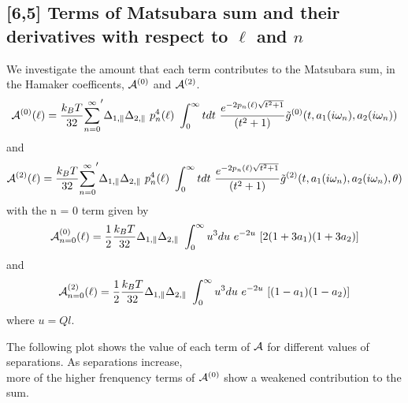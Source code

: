 \documentclass[a4paper]{article}
\begin{document}
\subsection{[6,5] Terms of Matsubara sum and their derivatives with respect to
$\ell$ and $n$}
\begin{center}
We investigate the amount that each term contributes to the Matsubara sum, in\\
the Hamaker coefficents, ${\cal A}^{(0)}$ and ${\cal A}^{(2)}$.
\begin{equation}
{\cal A}^{(0)}(\ell) = \frac{k_BT}{32}  {\sum_{n=0}^{\infty}}' \Delta_{1,\parallel} \Delta_{2,\parallel} ~p_n^{4}(\ell) ~\int_0^{\infty} t dt ~\frac{e^{- 2 p_n(\ell) \sqrt{t^{2} + 1}}}{(t^{2} + 1)} \tilde g^{(0)}(t, a_1(i \omega_n), a_2(i \omega_n))
\end{equation}
and
\begin{equation}
{\cal A}^{(2)}(\ell) = \frac{k_BT}{32}  {\sum_{n=0}^{\infty}}' \Delta_{1,\parallel} \Delta_{2,\parallel} ~p_n^{4}(\ell) ~\int_0^{\infty} t dt ~\frac{e^{- 2 p_n(\ell) \sqrt{t^{2} + 1}}}{(t^{2} + 1)} \tilde g^{(2)}(t, a_1(i \omega_n), a_2(i \omega_n), \theta)
\end{equation}
with the n = 0 term given by
\begin{equation}
    {\cal A}_{n=0}^{(0)}(\ell) = \frac{1}{2} \frac{k_BT}{32}
    \Delta_{1,\parallel} \Delta_{2,\parallel} ~\int_0^{\infty} u^3 du\,\,
    e^{-2u}\,\,[2(1 + 3a_1)(1 + 3a_2) ]
\end{equation}
and
\begin{equation}
    {\cal A}_{n=0}^{(2)}(\ell) = \frac{1}{2} \frac{k_BT}{32}
    \Delta_{1,\parallel} \Delta_{2,\parallel} ~\int_0^{\infty} u^3 du\,\,
    e^{-2u}\,\,[(1 - a_1)(1 - a_2) ]
\end{equation}
where $u = Ql$.

\hskip 73pt
The following plot shows the value of each term of ${\cal A}$ for different values of separations. As separations increase,\\ 
more of the higher frenquency terms of ${\cal A}^{(0)}$ show a weakened contribution to the sum.\\
\smallskip{}


\end{center}
\end{document}
